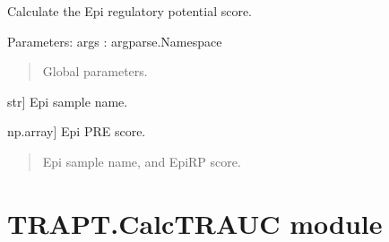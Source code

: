\documentclass[letterpaper,10pt,english]{sphinxmanual}
\begin{document}
\begin{fulllineitems}
\label{\detokenize{index:TRAPT.CalcSampleRPMatrix.dhs2gene}}
\pysigstartsignatures
{}
\pysigstopsignatures
\sphinxAtStartPar
Calculate the Epi regulatory potential score.

\sphinxAtStartPar
Parameters:
args : argparse.Namespace
\begin{quote}

\sphinxAtStartPar
Global parameters.
\end{quote}
\begin{description}
\sphinxlineitem{sample}{[}str{]}
\sphinxAtStartPar
Epi sample name.

\sphinxlineitem{vec}{[}np.array{]}
\sphinxAtStartPar
Epi PRE score.

\end{description}
\begin{quote}\begin{description}
\sphinxAtStartPar
Epi sample name, and Epi\sphinxhyphen{}RP score.

\end{description}\end{quote}

\end{fulllineitems}



\chapter{TRAPT.CalcTRAUC module}
\label{\detokenize{index:module-TRAPT.CalcTRAUC}}\label{\detokenize{index:trapt-calctrauc-module}}
\end{document}
